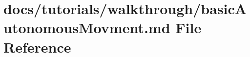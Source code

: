 \hypertarget{basicAutonomousMovment_8md}{}\section{docs/tutorials/walkthrough/basic\+Autonomous\+Movment.md File Reference}
\label{basicAutonomousMovment_8md}
